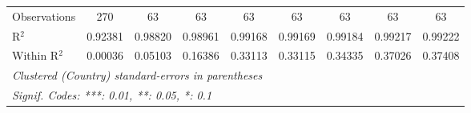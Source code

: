 \begin{table}[htbp]
\begin{tabular}{lcccccccc}
      Observations                                                                      & 270      & 63       & 63             & 63             & 63             & 63             & 63             & 63\\  
      R$^2$                                                                             & 0.92381  & 0.98820  & 0.98961        & 0.99168        & 0.99169        & 0.99184        & 0.99217        & 0.99222\\  
      Within R$^2$                                                                      & 0.00036  & 0.05103  & 0.16386        & 0.33113        & 0.33115        & 0.34335        & 0.37026        & 0.37408\\  
      \midrule \midrule
      \multicolumn{9}{l}{\emph{Clustered (Country) standard-errors in parentheses}}\\
      \multicolumn{9}{l}{\emph{Signif. Codes: ***: 0.01, **: 0.05, *: 0.1}}\\
   \end{tabular}
\end{table}


